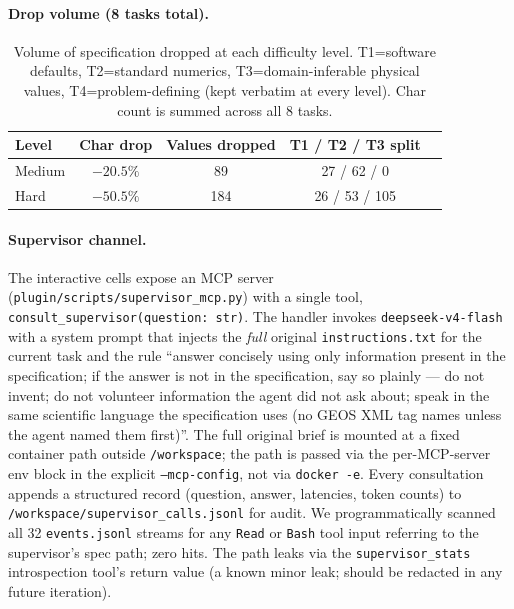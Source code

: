 \documentclass{article}
\begin{document}
\paragraph{Drop volume (8 tasks total).}

\begin{table}[h]
  \caption{Volume of specification dropped at each difficulty level. T1=software defaults, T2=standard numerics, T3=domain-inferable physical values, T4=problem-defining (kept verbatim at every level). Char count is summed across all 8 tasks.}
  \label{tab:autonomy-drop}
  \centering
  \small
  \begin{tabular}{lcccc}
    \toprule
    \textbf{Level} & \textbf{Char drop} & \textbf{Values dropped} & \textbf{T1 / T2 / T3 split} \\
    \midrule
    Medium & $-20.5\%$ & 89  & 27 / 62 / 0 \\
    Hard   & $-50.5\%$ & 184 & 26 / 53 / 105 \\
    \bottomrule
  \end{tabular}
\end{table}

\paragraph{Supervisor channel.} The interactive cells expose an MCP server (\texttt{plugin/scripts/supervisor\_mcp.py}) with a single tool, \texttt{consult\_supervisor(question: str)}. The handler invokes \texttt{deepseek-v4-flash} with a system prompt that injects the \emph{full} original \texttt{instructions.txt} for the current task and the rule ``answer concisely using only information present in the specification; if the answer is not in the specification, say so plainly --- do not invent; do not volunteer information the agent did not ask about; speak in the same scientific language the specification uses (no GEOS XML tag names unless the agent named them first)''. The full original brief is mounted at a fixed container path outside \texttt{/workspace}; the path is passed via the per-MCP-server env block in the explicit \texttt{--mcp-config}, not via \texttt{docker -e}. Every consultation appends a structured record (question, answer, latencies, token counts) to \texttt{/workspace/supervisor\_calls.jsonl} for audit. We programmatically scanned all 32 \texttt{events.jsonl} streams for any \texttt{Read} or \texttt{Bash} tool input referring to the supervisor's spec path; zero hits. The path leaks via the \texttt{supervisor\_stats} introspection tool's return value (a known minor leak; should be redacted in any future iteration).
\end{document}
